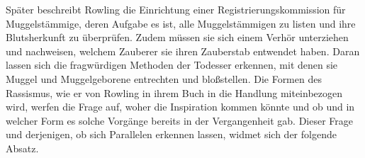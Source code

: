 Später beschreibt Rowling die Einrichtung einer \glqq Registrierungskommission für Muggelstämmige\grqq , deren Aufgabe es ist, alle Muggelstämmigen zu listen und ihre Blutsherkunft zu überprüfen. 
Zudem müssen sie sich einem Verhör unterziehen und nachweisen, welchem Zauberer sie ihren Zauberstab entwendet haben\cite [S.\,268]{JKR10}. 
Daran lassen sich die fragwürdigen Methoden der Todesser erkennen, mit denen sie Muggel und Muggelgeborene entrechten und bloßstellen. 
Die Formen des Rassismus, wie er von Rowling in ihrem Buch in die Handlung miteinbezogen wird, werfen die Frage auf, woher die Inspiration kommen könnte und ob und in welcher Form es solche Vorgänge bereits in der Vergangenheit gab. Dieser Frage und derjenigen, ob sich Parallelen erkennen lassen, widmet sich der folgende Absatz.






